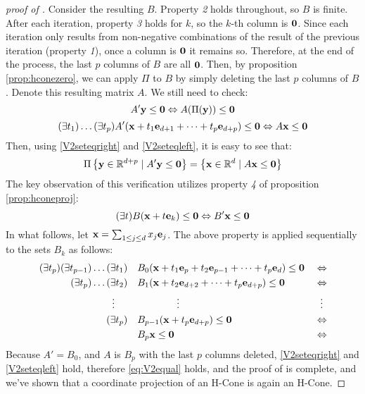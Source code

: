\begin{proof}[proof of \Vproj]
Consider the resulting $B$.  Property \textit{2} holds throughout, so $B$ is finite.  After each iteration, property \textit{3} holds for $k$, so the $k$-th column is $\mathbf{0}$.  Since each iteration only results from non-negative combinations of the result of the previous iteration (property \textit{1}), once a column is $\mathbf{0}$ it remains so.  Therefore, at the end of the process, the last $p$ columns of $B$ are all $\mathbf{0}$.  Then, by proposition \ref{prop:hconezero}, we can apply $\Pi$ to $B$ by simply deleting the last $p$ columns of $B$.  Denote this resulting matrix $A$.  We still need to check:
\begin{equation}\label{V2seteqright}
   A'\mathbf{y} \leq \mathbf{0} \Leftrightarrow A(\Pi(\mathbf{y})) \leq \mathbf{0} 
\end{equation}
\begin{equation}\label{V2seteqleft}
  (\exists t_1)\dots(\exists t_p) A'(\mathbf{x}+t_1\mathbf{e}_{d+1}+\cdots+t_p\mathbf{e}_{d+p}) \leq \mathbf{0}
          \Leftrightarrow A\mathbf{x} \leq \mathbf{0}
\end{equation}
Then, using \eqref{V2seteqright} and \eqref{V2seteqleft}, it is easy to see that:
\begin{equation}\label{eq:V2equal}
   \Pi\left\{\mathbf{y}\in\mathbb{R}^{d+p}\;|\; A'\mathbf{y}\leq\mathbf{0}\right\} = \left\{\mathbf{x}\in\mathbb{R}^{d}\;|\; A\mathbf{x}\leq\mathbf{0}\right\} 
\end{equation}
The key observation of this verification utilizes property \textit{4} of proposition \ref{prop:hconeproj}:
  \[ (\exists t)B(\mathbf{x} + t\mathbf{e}_k) \leq \mathbf{0} \Leftrightarrow B'\mathbf{x} \leq \mathbf{0} \]
In what follows, let $\mathbf{x} = \sum_{1 \leq j \leq d}x_j\mathbf{e}_j$.  The above property is applied sequentially to the sets $B_k$ as follows:
\begin{alignat*}{2}
  (\exists t_p)(\exists t_{p-1})\dots(\exists t_1)&\quad 
                B_0(\mathbf{x} + t_1\mathbf{e}_{p} + t_2\mathbf{e}_{p-1} + \dots + t_p\mathbf{e}_{d}) \leq \mathbf{0}\;&
                   \Leftrightarrow \\
               (\exists t_p)\dots(\exists t_2)&\quad 
                B_1(\mathbf{x} + t_2\mathbf{e}_{d+2} + \dots + t_p\mathbf{e}_{d+p}) 
                    \leq \mathbf{0} &\Leftrightarrow \\
           \vdots \hspace{1.3em} & \hspace{5em}\vdots & \vdots\hspace{0.4em} \\
   (\exists t_p)&\quad B_{p-1}(\mathbf{x} + t_p\mathbf{e}_{d+p})  \leq \mathbf{0} & \Leftrightarrow \\
           &\quad B_{p}\mathbf{x}  \leq \mathbf{0} & \Leftrightarrow
\end{alignat*}
Because $A' = B_0$, and $A$ is $B_p$ with the last $p$ columns deleted, \eqref{V2seteqright} and \eqref{V2seteqleft} hold, therefore \eqref{eq:V2equal} holds, and the proof of {\Vproj} is complete, and we've shown that a coordinate projection of an H-Cone is again an H-Cone.
\end{proof}


